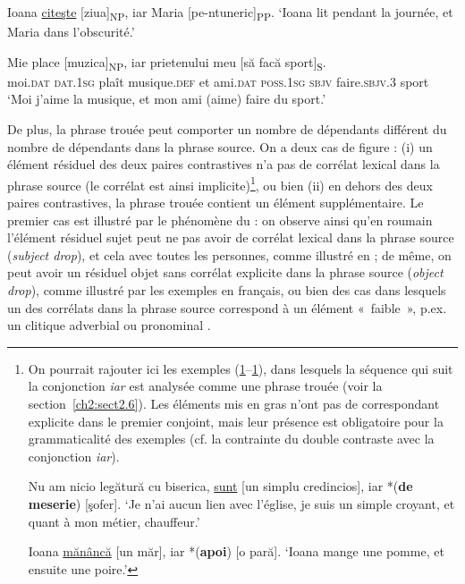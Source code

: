 \ea
\ea Ioana \uline{citeşte} [ziua]\textsubscript{NP}, iar Maria [pe-ntuneric]\textsubscript{PP}. \label{ch2:ex133a}
\glt  ‘Ioana lit pendant la journée, et Maria dans l’obscurité.’ 

\ex  
\gll Mie    place  [muzica]\textsubscript{NP},  iar  prietenului  meu  [să  facă  sport]\textsubscript{S}. \label{ch2:ex133b}\\
moi.\textsc{dat} \textsc{dat.1sg}  plaît  musique.\textsc{def}  et  ami.\textsc{dat}  \textsc{poss.1sg}  \textsc{sbjv}  faire.\textsc{sbjv.3} sport\\ 
\glt ‘Moi j’aime la musique, et mon ami (aime) faire du sport.’ 
\z
\z

De plus, la phrase trouée peut comporter un nombre de dépendants différent du nombre de dépendants dans la phrase source. On a deux cas de figure : (i) un élément résiduel des deux paires contrastives n’a pas de corrélat lexical dans la phrase source (le corrélat est ainsi implicite)\footnote{\label{ch2:fn43}
 On pourrait rajouter ici les exemples (\ref{ch2:foot43i}--\ref{ch2:foot43ii}), dans lesquels la séquence qui suit la conjonction \textit{iar} est analysée comme une phrase trouée (voir la section~\ref{ch2:sect2.6}). Les éléments mis en gras n’ont pas de correspondant explicite dans le premier conjoint, mais leur présence est obligatoire pour la grammaticalité des exemples (cf. la contrainte du double contraste avec la conjonction \textit{iar}).
 
 \ea
 \ea Nu am nicio legătură cu biserica, \uline{sunt} [un simplu credincios], iar *(\textbf{de meserie}) [şofer]. \label{ch2:foot43i}
 \glt  ‘Je n’ai aucun lien avec l’église, je suis un simple croyant, et quant à mon métier, chauffeur.’

\ex Ioana \uline{mănâncă} [un măr], iar *(\textbf{apoi}) [o pară]. \label{ch2:foot43ii}
\glt ‘Ioana mange une pomme, et ensuite une poire.’
\z
\z
}, ou bien (ii) en dehors des deux paires contrastives, la phrase trouée contient un élément supplémentaire. Le premier cas est illustré par le phénomène du  : on observe ainsi qu’en roumain l’élément résiduel sujet peut ne pas avoir de corrélat lexical dans la phrase source (\textit{subject drop}), et cela avec toutes les personnes, comme illustré en  ; de même, on peut avoir un résiduel objet sans corrélat explicite dans la phrase source (\textit{object drop}), comme illustré par les exemples  en français, ou bien des cas dans lesquels un des corrélats dans la phrase source correspond à un élément «~faible~», p.ex. un clitique adverbial  ou pronominal .

